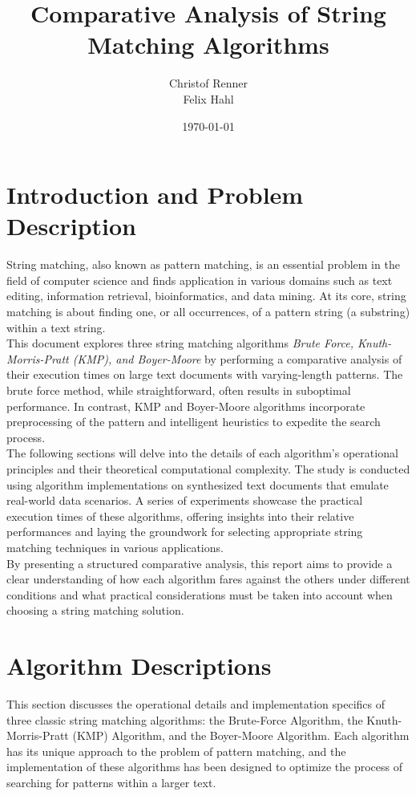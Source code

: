 \documentclass{article}
\title{Comparative Analysis of String Matching Algorithms}
\author{Christof Renner\\
        Felix Hahl\\}
\date{\today}
\begin{document}
\maketitle

\section{Introduction and Problem Description}
String matching, also known as pattern matching, is an essential problem in the field of computer science and finds application in various domains such as text editing, information retrieval, bioinformatics, and data mining. At its core, string matching is about finding one, or all occurrences, of a pattern string (a substring) within a text string.\\

This document explores three string matching algorithms \emph{Brute Force, Knuth-Morris-Pratt (KMP), and Boyer-Moore} by performing a comparative analysis of their execution times on large text documents with varying-length patterns. The brute force method, while straightforward, often results in suboptimal performance. In contrast, KMP and Boyer-Moore algorithms incorporate preprocessing of the pattern and intelligent heuristics to expedite the search process.\\

The following sections will delve into the details of each algorithm's operational principles and their theoretical computational complexity. The study is conducted using algorithm implementations on synthesized text documents that emulate real-world data scenarios. A series of experiments showcase the practical execution times of these algorithms, offering insights into their relative performances and laying the groundwork for selecting appropriate string matching techniques in various applications.\\

By presenting a structured comparative analysis, this report aims to provide a clear understanding of how each algorithm fares against the others under different conditions and what practical considerations must be taken into account when choosing a string matching solution.

\section{Algorithm Descriptions}

This section discusses the operational details and implementation specifics of three classic string matching algorithms: the Brute-Force Algorithm, the Knuth-Morris-Pratt (KMP) Algorithm, and the Boyer-Moore Algorithm. Each algorithm has its unique approach to the problem of pattern matching, and the implementation of these algorithms has been designed to optimize the process of searching for patterns within a larger text.
\end{document}
